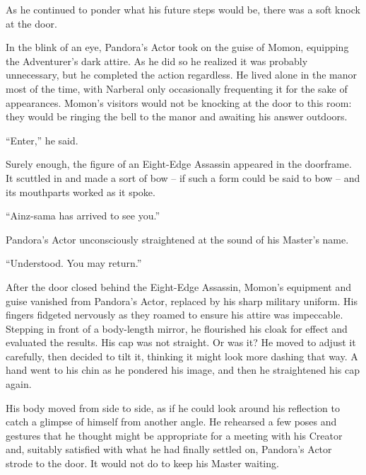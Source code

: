  

As he continued to ponder what his future steps would be, there was a soft knock at the door.

 

In the blink of an eye, Pandora’s Actor took on the guise of Momon, equipping the Adventurer’s dark attire. As he did so he realized it was probably unnecessary, but he completed the action regardless. He lived alone in the manor most of the time, with Narberal only occasionally frequenting it for the sake of appearances. Momon’s visitors would not be knocking at the door to this room: they would be ringing the bell to the manor and awaiting his answer outdoors.

 

“Enter,” he said.

 

Surely enough, the figure of an Eight-Edge Assassin appeared in the doorframe. It scuttled in and made a sort of bow – if such a form could be said to bow – and its mouthparts worked as it spoke.

 

“Ainz-sama has arrived to see you.”

 

Pandora’s Actor unconsciously straightened at the sound of his Master’s name.

 

“Understood. You may return.”

 

After the door closed behind the Eight-Edge Assassin, Momon’s equipment and guise vanished from Pandora’s Actor, replaced by his sharp military uniform. His fingers fidgeted nervously as they roamed to ensure his attire was impeccable. Stepping in front of a body-length mirror, he flourished his cloak for effect and evaluated the results. His cap was not straight. Or was it? He moved to adjust it carefully, then decided to tilt it, thinking it might look more dashing that way. A hand went to his chin as he pondered his image, and then he straightened his cap again.

 

His body moved from side to side, as if he could look around his reflection to catch a glimpse of himself from another angle. He rehearsed a few poses and gestures that he thought might be appropriate for a meeting with his Creator and, suitably satisfied with what he had finally settled on, Pandora’s Actor strode to the door. It would not do to keep his Master waiting.

